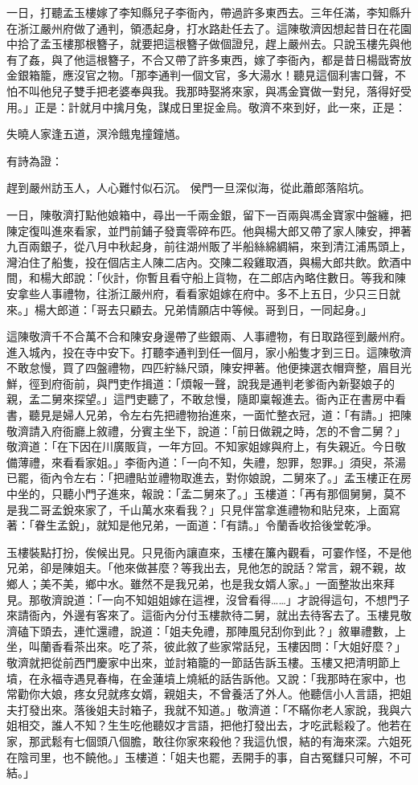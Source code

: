 一日，打聽孟玉樓嫁了李知縣兒子李衙內，帶過許多東西去。三年任滿，李知縣升在浙江嚴州府做了通判，領憑起身，打水路赴任去了。這陳敬濟因想起昔日在花園中拾了孟玉樓那根簪子，就要把這根簪子做個證兒，趕上嚴州去。只說玉樓先與他有了姦，與了他這根簪子，不合又帶了許多東西，嫁了李衙內，都是昔日楊戩寄放金銀箱籠，應沒官之物。「那李通判一個文官，多大湯水！聽見這個利害口聲，不怕不叫他兒子雙手把老婆奉與我。我那時娶將來家，與馮金寶做一對兒，落得好受用。」正是：計就月中擒月兔，謀成日里捉金烏。敬濟不來到好，此一來，正是：

失曉人家逢五道，溟泠餓鬼撞鐘馗。

有詩為證：

趕到嚴州訪玉人，人心難忖似石沉。
侯門一旦深似海，從此蕭郎落陷坑。

一日，陳敬濟打點他娘箱中，尋出一千兩金銀，留下一百兩與馮金寶家中盤纏，把陳定復叫進來看家，並門前鋪子發賣零碎布匹。他與楊大郎又帶了家人陳安，押著九百兩銀子，從八月中秋起身，前往湖州販了半船絲綿綢絹，來到清江浦馬頭上，灣泊住了船隻，投在個店主人陳二店內。交陳二殺雞取酒，與楊大郎共飲。飲酒中間，和楊大郎說：「伙計，你暫且看守船上貨物，在二郎店內略住數日。等我和陳安拿些人事禮物，往浙江嚴州府，看看家姐嫁在府中。多不上五日，少只三日就來。」楊大郎道：「哥去只顧去。兄弟情願店中等候。哥到日，一同起身。」

這陳敬濟千不合萬不合和陳安身邊帶了些銀兩、人事禮物，有日取路徑到嚴州府。進入城內，投在寺中安下。打聽李通判到任一個月，家小船隻才到三日。這陳敬濟不敢怠慢，買了四盤禮物，四匹紵絲尺頭，陳安押著。他便揀選衣帽齊整，眉目光鮮，徑到府衙前，與門吏作揖道：「煩報一聲，說我是通判老爹衙內新娶娘子的親，孟二舅來探望。」這門吏聽了，不敢怠慢，隨即稟報進去。衙內正在書房中看書，聽見是婦人兄弟，令左右先把禮物抬進來，一面忙整衣冠，道：「有請。」把陳敬濟請入府衙廳上敘禮，分賓主坐下，說道：「前日做親之時，怎的不會二舅？」敬濟道：「在下因在川廣販貨，一年方回。不知家姐嫁與府上，有失親近。今日敬備薄禮，來看看家姐。」李衙內道：「一向不知，失禮，恕罪，恕罪。」須臾，茶湯已罷，衙內令左右：「把禮貼並禮物取進去，對你娘說，二舅來了。」孟玉樓正在房中坐的，只聽小門子進來，報說：「孟二舅來了。」玉樓道：「再有那個舅舅，莫不是我二哥孟銳來家了，千山萬水來看我？」只見伴當拿進禮物和貼兒來，上面寫著：「眷生孟銳」，就知是他兄弟，一面道：「有請。」令蘭香收拾後堂乾凈。

玉樓裝點打扮，俟候出見。只見衙內讓直來，玉樓在簾內觀看，可霎作怪，不是他兄弟，卻是陳姐夫。「他來做甚麼？等我出去，見他怎的說話？常言，親不親，故鄉人；美不美，鄉中水。雖然不是我兄弟，也是我女婿人家。」一面整妝出來拜見。那敬濟說道：「一向不知姐姐嫁在這裡，沒曾看得……」才說得這句，不想門子來請衙內，外邊有客來了。這衙內分付玉樓款待二舅，就出去待客去了。玉樓見敬濟磕下頭去，連忙還禮，說道：「姐夫免禮，那陣風兒刮你到此？」敘畢禮數，上坐，叫蘭香看茶出來。吃了茶，彼此敘了些家常話兒，玉樓因問：「大姐好麼？」敬濟就把從前西門慶家中出來，並討箱籠的一節話告訴玉樓。玉樓又把清明節上墳，在永福寺遇見春梅，在金蓮墳上燒紙的話告訴他。又說：「我那時在家中，也常勸你大娘，疼女兒就疼女婿，親姐夫，不曾養活了外人。他聽信小人言語，把姐夫打發出來。落後姐夫討箱子，我就不知道。」敬濟道：「不瞞你老人家說，我與六姐相交，誰人不知？生生吃他聽奴才言語，把他打發出去，才吃武鬆殺了。他若在家，那武鬆有七個頭八個膽，敢往你家來殺他？我這仇恨，結的有海來深。六姐死在陰司里，也不饒他。」玉樓道：「姐夫也罷，丟開手的事，自古冤讎只可解，不可結。」

